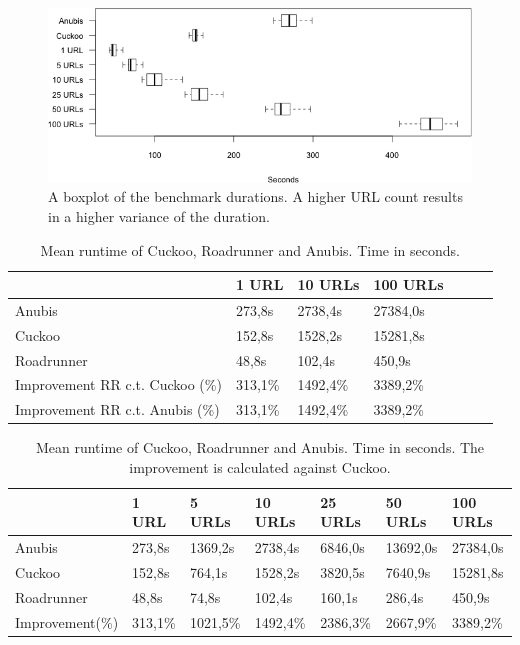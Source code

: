 
\begin{figure}[h!]
    \centering
    \centerline{\includegraphics[width=15cm]{Images/chart-box.png}}
    \caption{A boxplot of the benchmark durations. A higher URL count results in a higher variance of the duration.}
    \label{fig:chart-box}
\end{figure}

\begin{table}[h]
\begin{tabular}{@{}lllllll@{}}
\toprule
                                  & 1 URL   & 10 URLs  & 100 URLs \\ \midrule
Anubis                            & 273,8s  & 2738,4s  & 27384,0s \\                                  
Cuckoo                            & 152,8s  & 1528,2s  & 15281,8s \\
Roadrunner                        & 48,8s   & 102,4s   & 450,9s   \\
Improvement RR c.t. Cuckoo (\%)   & 313,1\% & 1492,4\% & 3389,2\% \\
Improvement RR c.t. Anubis (\%)   & 313,1\% & 1492,4\% & 3389,2\% \\ \bottomrule
\end{tabular}
\caption{Mean runtime of Cuckoo, Roadrunner and Anubis. Time in seconds.}
\label{tbl:results}
\end{table}
\begin{table}[h]
\begin{tabular}{@{}lllllll@{}}
\toprule
                                  & 1 URL    & 5 URLs   & 10 URLs      & 25 URLs      & 50 URLs     & 100 URLs \\ \midrule
Anubis       & 273,8s   & 1369,2s   & 2738,4s      & 6846,0s      & 13692,0s     & 27384,0s \\                                  
Cuckoo       & 152,8s   & 764,1s   & 1528,2s      & 3820,5s      & 7640,9s     & 15281,8s \\
Roadrunner& 48,8s    & 74,8s    & 102,4s       & 160,1s       & 286,4s      & 450,9s   \\
Improvement(\%)                   & 313,1\%  & 1021,5\% & 1492,4\%     & 2386,3\%     & 2667,9\%    & 3389,2\% \\ \bottomrule
\end{tabular}
\caption{Mean runtime of Cuckoo, Roadrunner and Anubis. Time in seconds. The improvement is calculated against Cuckoo.}
\label{tbl:results}
\end{table}

